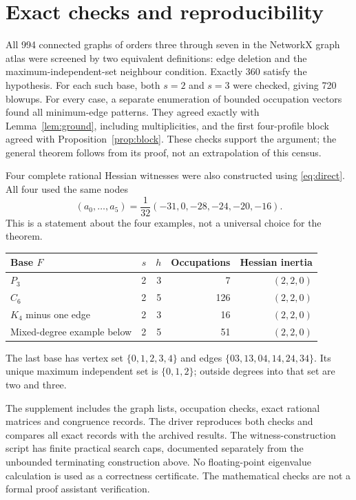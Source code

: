 \documentclass[11pt]{article}
\theoremstyle{remark}\newtheorem{remark}[theorem]{Remark}
\begin{document}
\section{Exact checks and reproducibility}

All 994 connected graphs of orders three through seven in the
NetworkX graph atlas were screened by two equivalent definitions:
edge deletion and the maximum-independent-set neighbour condition.
Exactly 360 satisfy the hypothesis. For each such base, both
$s=2$ and $s=3$ were checked, giving 720 blowups.
For every case, a separate enumeration of bounded occupation
vectors found all minimum-edge patterns. They agreed exactly with
Lemma~\ref{lem:ground}, including multiplicities, and the first
four-profile block agreed with Proposition~\ref{prop:block}.
These checks support the argument; the general theorem follows
from its proof, not an extrapolation of this census.

Four complete rational Hessian witnesses were also constructed
using \eqref{eq:direct}. All four used the same nodes
\[
 (a_0,\ldots,a_5)=
 \frac1{32}(-31,0,-28,-24,-20,-16).
\]
This is a statement about the four examples, not a universal
choice for the theorem.

\begin{center}
\begin{tabular}{@{}lrrrr@{}}
\toprule
Base $F$ & $s$ & $h$ & Occupations & Hessian inertia\\
\midrule
$P_3$ & 2 & 3 & 7 & $(2,2,0)$\\
$C_6$ & 2 & 5 & 126 & $(2,2,0)$\\
$K_4$ minus one edge & 2 & 3 & 16 & $(2,2,0)$\\
Mixed-degree example below & 2 & 5 & 51 & $(2,2,0)$\\
\bottomrule
\end{tabular}
\end{center}
The last base has vertex set $\{0,1,2,3,4\}$ and edges
$\{03,13,04,14,24,34\}$. Its unique maximum independent set is
$\{0,1,2\}$; outside degrees into that set are two and three.

The supplement includes the graph lists, occupation checks,
exact rational matrices and congruence records. The driver
 reproduces both checks and compares all exact
records with the archived results. The witness-construction script
has finite practical search caps, documented separately
from the unbounded terminating construction above.
No floating-point eigenvalue calculation is used as a correctness
certificate. The mathematical checks are not a formal proof
assistant verification.
\end{document}
